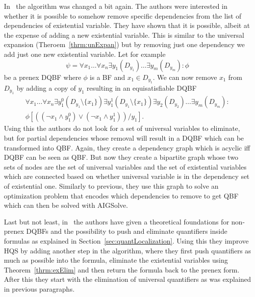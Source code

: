 \documentclass[
  digital, %
  twoside, %
  table,   %
  nolof,     %
  nolot,     %
]{fithesis3}
\theoremstyle{definition}
\theoremstyle{remark}
\begin{document}
In~\cite{HQSdependencyElimination} the algorithm was changed a bit again. The authors were interested in whether it is possible to somehow remove specific dependencies from the list of dependencies of existential variable. They have shown that it is possible, albeit at the expense of adding a new existential variable. This is similar to the universal expansion (Theroem~\ref{thrm:unExpan}) but by removing just one dependency we add just one new existential variable. Let for example
\[\psi = \forall x_1 \dots \forall x_n \exists y_1(D_{y_1}) \dots \exists y_m(D_{y_m}) \colon \phi\]
be a prenex DQBF where $\phi$ is a BF and $x_1 \in D_{y_1}$. We can now remove $x_1$ from $D_{y_1}$ by adding a copy of $y_1$ resulting in an equisatisfiable DQBF
\begin{multline*}
\forall x_1 \dots \forall x_n \exists y_1^0(D_{y_1} \setminus \{x_1\}) \exists y_1^1(D_{y_1} \setminus \{x_1\}) \exists y_2(D_{y_2})\dots \exists y_m(D_{y_m}) \colon \\
\phi\left[((\neg x_1 \land y_1^0) \lor (\neg x_1 \land y_1^1))/y_1\right].
\end{multline*}
Using this the authors do not look for a set of universal variables to eliminate, but for partial dependencies whose removal will result in a DQBF which can be transformed into QBF. Again, they create a dependency graph which is acyclic iff DQBF can be seen as QBF. But now they create a bipartite graph whose two sets of nodes are the set of universal variables and the set of existential variables which are connected based on whether universal variable is in the dependency set of existential one. Similarly to previous, they use this graph to solve an optimization problem that encodes which dependencies to remove to get QBF which can then be solved with AIGSolve.

Last but not least, in~\cite{HQSquantifierLocalization} the authors have given a theoretical foundations for non-prenex DQBFs and the possibility to push and eliminate quantifiers inside formulas as explained in Section~\ref{sec:quantLocalization}. Using this they improve HQS by adding another step in the algorithm, where they first push quantifiers as much as possible into the formula, eliminate the existential variables using Theorem~\ref{thrm:exElim} and then return the formula back to the prenex form. After this they start with the elimination of universal quantifiers as was explained in previous paragraphs.
\end{document}
